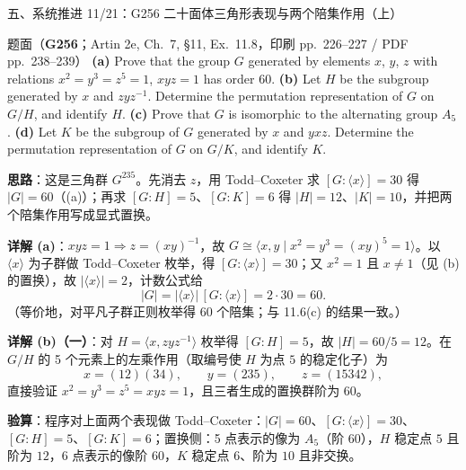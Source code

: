 \documentclass[aspectratio=169,10pt,fontset=none]{ctexbeamer}
\newcommand{\ex}[1]{\textcolor{accent}{\footnotesize\bfseries #1}}
\newcommand{\key}[1]{\textcolor{ink}{\bfseries #1}}
\begin{document}
\begin{frame}[t]{五、系统推进 11/21：G256 二十面体三角形表现与两个陪集作用（上）}
\label{ex:G256}
\scriptsize
\begin{block}{\footnotesize 题面（\ex{G256}；Artin 2e, Ch.~7, §11, Ex.~11.8，印刷 pp.~226--227 / PDF pp.~238--239）}
\textbf{(a)} Prove that the group $G$ generated by elements $x$, $y$, $z$ with relations $x^2=y^3=z^5=1$, $xyz=1$ has order 60.
\textbf{(b)} Let $H$ be the subgroup generated by $x$ and $zyz^{-1}$. Determine the permutation representation of $G$ on $G/H$, and identify $H$.
\textbf{(c)} Prove that $G$ is isomorphic to the alternating group $A_5$.
\textbf{(d)} Let $K$ be the subgroup of $G$ generated by $x$ and $yxz$. Determine the permutation representation of $G$ on $G/K$, and identify $K$.
\end{block}
\key{思路}：这是三角群 $G^{235}$。先消去 $z$，用 Todd--Coxeter 求 $[G:\langle x\rangle]=30$ 得 $|G|=60$（(a)）；再求 $[G:H]=5$、$[G:K]=6$ 得 $|H|=12$、$|K|=10$，并把两个陪集作用写成显式置换。

\key{详解 (a)}：$xyz=1\Rightarrow z=(xy)^{-1}$，故 $G\cong\langle x,y\mid x^2=y^3=(xy)^5=1\rangle$。以 $\langle x\rangle$ 为子群做 Todd--Coxeter 枚举，得 $[G:\langle x\rangle]=30$；又 $x^2=1$ 且 $x\ne1$（见 (b) 的置换），故 $|\langle x\rangle|=2$，计数公式给
\[
|G|=|\langle x\rangle|\,[G:\langle x\rangle]=2\cdot30=60 .
\]
（等价地，对平凡子群正则枚举得 60 个陪集；与 11.6(c) 的结果一致。）

\key{详解 (b)（一）}：对 $H=\langle x,zyz^{-1}\rangle$ 枚举得 $[G:H]=5$，故 $|H|=60/5=12$。在 $G/H$ 的 5 个元素上的左乘作用（取编号使 $H$ 为点 $5$ 的稳定化子）为
\[
x=(12)(34),\qquad y=(235),\qquad z=(15342),
\]
直接验证 $x^2=y^3=z^5=xyz=1$，且三者生成的置换群阶为 $60$。

\key{验算}：程序对上面两个表现做 Todd--Coxeter：$|G|=60$、$[G:\langle x\rangle]=30$、$[G:H]=5$、$[G:K]=6$；置换侧：5 点表示的像为 $A_5$（阶 $60$），$H$ 稳定点 $5$ 且阶为 $12$，6 点表示的像阶 $60$，$K$ 稳定点 $6$、阶为 $10$ 且非交换。
\end{frame}
\end{document}
